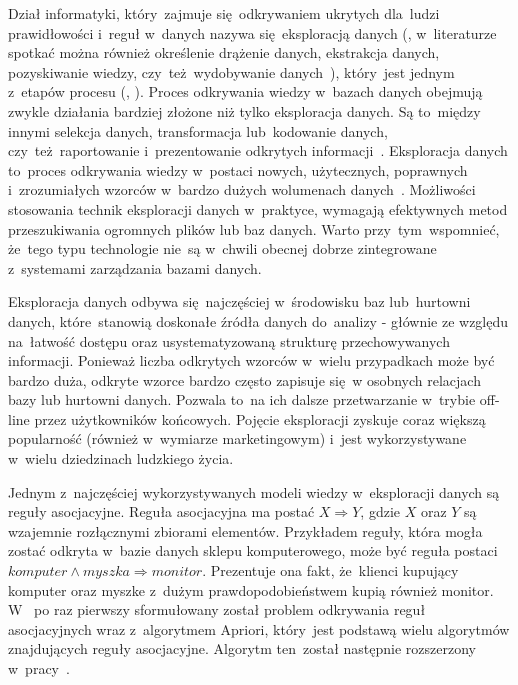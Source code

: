 Dział informatyki, który~zajmuje się~odkrywaniem ukrytych dla~ludzi prawidłowości i~reguł w~danych nazywa się~eksploracją danych (, w~literaturze spotkać można również określenie drążenie danych, ekstrakcja danych, pozyskiwanie wiedzy, czy~też~wydobywanie danych~\cite{Elmasri:db}), który~jest jednym z~etapów procesu  (, ). Proces odkrywania wiedzy w~bazach danych obejmują zwykle działania bardziej złożone niż tylko eksploracja danych. Są to~między innymi selekcja danych, transformacja lub~kodowanie danych, czy~też~raportowanie i~prezentowanie odkrytych informacji~\cite{Elmasri:db}. Eksploracja danych to~proces odkrywania wiedzy w~postaci nowych, użytecznych, poprawnych i~zrozumiałych wzorców w~bardzo dużych wolumenach danych~\cite{DataMiningStart}. Możliwości stosowania technik eksploracji danych w~praktyce, wymagają efektywnych metod przeszukiwania ogromnych plików lub baz danych. Warto przy~tym~wspomnieć, że~tego typu technologie nie~są w~chwili obecnej dobrze zintegrowane z~systemami zarządzania bazami danych.

Eksploracja danych odbywa się~najczęściej w~środowisku baz lub~hurtowni danych, które~stanowią doskonałe źródła danych do~analizy - głównie ze względu na~łatwość dostępu oraz usystematyzowaną strukturę przechowywanych informacji. Ponieważ liczba odkrytych wzorców w~wielu przypadkach może być bardzo duża, odkryte wzorce bardzo często zapisuje się~w osobnych relacjach bazy lub hurtowni danych. Pozwala to~na ich dalsze przetwarzanie w~trybie off-line przez użytkowników końcowych. Pojęcie eksploracji zyskuje coraz większą popularność (również w~wymiarze marketingowym) i~jest wykorzystywane w~wielu dziedzinach ludzkiego życia.

Jednym z~najczęściej wykorzystywanych modeli wiedzy w~eksploracji danych są reguły asocjacyjne. Reguła asocjacyjna ma postać $X \Rightarrow Y$, gdzie $X$ oraz $Y$ są wzajemnie rozłącznymi zbiorami elementów. Przykładem reguły, która mogła zostać odkryta w~bazie danych sklepu komputerowego, może być reguła postaci $komputer \land myszka \Rightarrow monitor$. Prezentuje ona fakt, że~klienci kupujący komputer oraz myszke z~dużym prawdopodobieństwem kupią również monitor. W~\cite{Problem:Statement} po raz pierwszy sformułowany został problem odkrywania reguł asocjacyjnych wraz z~algorytmem Apriori, który~jest podstawą wielu algorytmów znajdujących reguły asocjacyjne. Algorytm ten~został następnie rozszerzony w~pracy~\cite{AssRulesStrt}.

